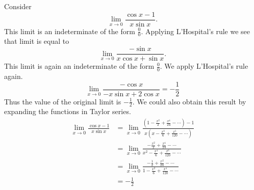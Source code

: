 \begin{example}
{\rm
Consider
  \[
  \lim_{x \to 0} \frac{\cos x - 1}{x \sin x}.
  \]
  This limit is an indeterminate of the form $\frac{0}{0}$.  Applying
  L'Hospital's rule we see that limit is equal to
  \[
  \lim_{x \to 0} \frac{-\sin x}{x \cos x + \sin x}.
  \]
  This limit is again an indeterminate of the form $\frac{0}{0}$.  We apply
  L'Hospital's rule again.
  \[
  \lim_{x \to 0} \frac{- \cos x}{ - x \sin x + 2 \cos x } = - \frac{1}{2}
  \]
  Thus the value of the original limit is $- \frac{1}{2}$.  We could also
  obtain this result by expanding the functions in Taylor series.
  \begin{align*}
    \lim_{x \to 0} \frac{\cos x - 1}{x \sin x}
    &= \lim_{x \to 0} \frac{\left( 1 - \frac{x^2}{2} + \frac{x^4}{24} 
        - \cdots \right) - 1 }{ x \left( x - \frac{x^3}{6} 
        + \frac{x^5}{120} - \cdots \right)} \\
    &= \lim_{x \to 0} \frac{- \frac{x^2}{2} + \frac{x^4}{24} - \cdots }
    { x^2 - \frac{x^4}{6} + \frac{x^6}{120} - \cdots } \\
    &= \lim_{x \to 0} \frac{- \frac{1}{2} + \frac{x^2}{24} - \cdots }
    { 1 - \frac{x^2}{6} + \frac{x^4}{120} - \cdots } \\
    &= - \frac{1}{2}
  \end{align*}
}
\end{example}






